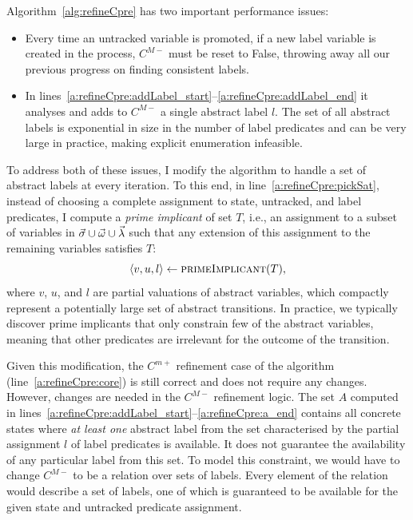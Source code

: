 Algorithm~\ref{alg:refineCpre} has two important performance issues: 

\begin{itemize}

    \item Every time an untracked variable is promoted, if a new label variable is created in the process, $C^{M-}$ must be reset to False, throwing away all our previous progress on finding consistent labels.

    \item In lines~\ref{a:refineCpre:addLabel_start}--\ref{a:refineCpre:addLabel_end} it analyses and adds to $C^{M-}$ a single abstract label $l$.  The set of all abstract labels is exponential in size in the number of label predicates and can be very large in practice, making explicit enumeration infeasible.  

\end{itemize}

To address both of these issues, I modify the algorithm to handle a set of abstract labels at every iteration.  To this end, in line~\ref{a:refineCpre:pickSat}, instead of choosing a complete assignment to state, untracked, and label predicates, I compute a \emph{prime implicant} of set $T$, i.e., an assignment to a subset of variables in $\vec{\sigma}\cup\vec{\omega}\cup\vec{\lambda}$ such that any extension of this assignment to the remaining variables satisfies $T$: 
$$
\langle v,u,l\rangle \gets \textsc{primeImplicant}(T),
$$ 
where $v$, $u$, and $l$ are partial valuations of abstract variables, which compactly represent a potentially large set of abstract transitions.  In practice, we typically discover prime implicants that only constrain few of the abstract variables, meaning that other predicates are irrelevant for the outcome of the transition.  

Given this modification, the $C^{m+}$ refinement case of the algorithm (line~\ref{a:refineCpre:core}) is still correct and does not require any changes.  However, changes are needed in the $C^{M-}$ refinement logic.  The set $A$ computed in lines~\ref{a:refineCpre:addLabel_start}--\ref{a:refineCpre:a_end} contains all concrete states where \emph{at least one} abstract label from the set characterised by the partial assignment $l$ of label predicates is available.  It does not guarantee the availability of any particular label from this set.  To model this constraint, we would have to change $C^{M-}$ to be a relation over sets of labels.  Every element of the relation would describe a set of labels, one of which is guaranteed to be available for the given state and untracked predicate assignment.  

